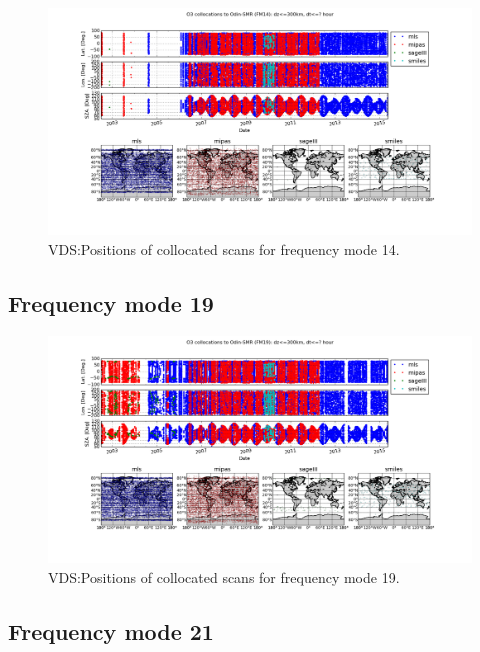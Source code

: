 \begin{figure}[t]
\centering
\includegraphics[width=17cm]{test_collocation_fm14.png}
\caption{VDS:Positions of collocated scans for frequency mode 14.}
\label{fig:vdsfm1}
\end{figure}

\clearpage
\newpage

\subsection{Frequency mode 19}

\begin{figure}[t]
\centering
\includegraphics[width=17cm]{test_collocation_fm19.png}
\caption{VDS:Positions of collocated scans for frequency mode 19.}
\label{fig:vdsfm1}
\end{figure}

\clearpage
\newpage

\subsection{Frequency mode 21}

